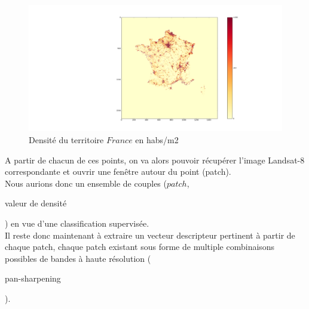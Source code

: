 \documentclass{book}
\begin{document}
\begin{figure}[H]
\begin{center}
\includegraphics[scale=0.2]{images/density_france.png}
\end{center}
\caption{Densité du territoire $France$ en habs/m2}
\label{densite_france}
\end{figure}

\clearpage

A partir de chacun de ces points, on va alors pouvoir récupérer l'image Landsat-8
correspondante et ouvrir une fenêtre autour du point (patch).\\
Nous aurions donc un ensemble de couples ($patch$,\begin{itshape}valeur de densité\end{itshape}) en vue d'une classification supervisée.\\
Il reste donc maintenant à extraire un vecteur descripteur pertinent à partir de chaque patch, chaque patch existant sous forme de multiple combinaisons
possibles de bandes à haute résolution (\begin{itshape}pan-sharpening\end{itshape}).

\backmatter

\listoftables

\listoffigures



\end{document}

